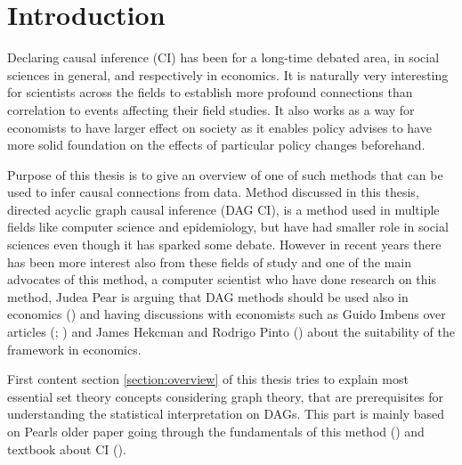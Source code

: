 \documentclass[main=english,12pt,a4paper,pdftex,econ,utf8]{aaltothesis}
\begin{document}


\section{Introduction}

Declaring causal inference (CI) has been for a long-time debated area, in social sciences in general, and respectively in economics. It is naturally very interesting for scientists across the fields to establish more profound connections than correlation to events affecting their field studies. It also works as a way for economists to have larger effect on society as it enables policy advises to have more solid foundation on the effects of particular policy changes beforehand.

Purpose of this thesis is to give an overview of one of such methods that can be used to infer causal connections from data. Method discussed in this thesis, directed acyclic graph causal inference (DAG CI), is a method used in multiple fields like computer science and epidemiology, but have had smaller role in social sciences even though it has sparked some debate. However in recent years there has been more interest also from these fields of study and one of the main advocates of this method, a computer scientist who have done research on this method, Judea Pear is arguing that DAG methods should be used also in economics (\cite{pearl_2014}) and having discussions with economists such as Guido Imbens over articles (\cite{Imbens2014}; \cite{imbes2020}) and James Hekcman and Rodrigo Pinto (\cite{Heckman2015}) about the suitability of the framework in economics.

First content section \ref{section:overview} of this thesis tries to explain most essential set theory concepts considering graph theory, that are prerequisites for understanding the statistical interpretation on DAGs. This part is mainly based on Pearls older paper going through the fundamentals of this method (\cite{Pearl1998}) and textbook about CI (\cite{Peters2017}).
\end{document}
